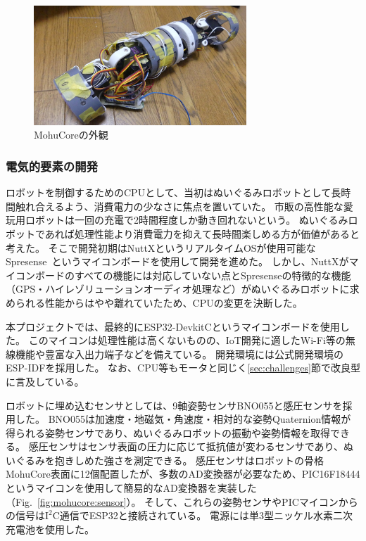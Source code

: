 \documentclass[uplatex,a4paper,12pt]{jsarticle}
\renewcommand{\figurename}{Fig.}
\newcommand{\figref}[1]{\figurename~\ref{#1}}
\begin{document}
\begin{figure}[htbp]
  \centering
  \includegraphics[width=8cm]{images/mohucore/skeleton.jpg}
  \caption{MohuCoreの外観}
  \label{fig:mohucore:skeleton}
\end{figure}

\subsubsection{電気的要素の開発}
ロボットを制御するためのCPUとして、当初はぬいぐるみロボットとして長時間触れ合えるよう、消費電力の少なさに焦点を置いていた。
市販の高性能な愛玩用ロボットは一回の充電で2時間程度しか動き回れないという。
ぬいぐるみロボットであれば処理性能より消費電力を抑えて長時間楽しめる方が価値があると考えた。
そこで開発初期はNuttXというリアルタイムOSが使用可能なSpresense~\cite{web_spresense}というマイコンボードを使用して開発を進めた。
しかし、NuttXがマイコンボードのすべての機能には対応していない点とSpresenseの特徴的な機能（GPS・ハイレゾリューションオーディオ処理など）がぬいぐるみロボットに求められる性能からはやや離れていたため、CPUの変更を決断した。

本プロジェクトでは、最終的にESP32-DevkitCというマイコンボードを使用した。
このマイコンは処理性能は高くないものの、IoT開発に適したWi-Fi等の無線機能や豊富な入出力端子などを備えている。
開発環境には公式開発環境のESP-IDFを採用した。
なお、CPU等もモータと同じく\ref{sec:challenges}節で改良型に言及している。

ロボットに埋め込むセンサとしては、9軸姿勢センサBNO055と感圧センサを採用した。
BNO055は加速度・地磁気・角速度・相対的な姿勢Quaternion情報が得られる姿勢センサであり、ぬいぐるみロボットの振動や姿勢情報を取得できる。
感圧センサはセンサ表面の圧力に応じて抵抗値が変わるセンサであり、ぬいぐるみを抱きしめた強さを測定できる。
感圧センサはロボットの骨格MohuCore表面に12個配置したが、多数のAD変換器が必要なため、PIC16F18444というマイコンを使用して簡易的なAD変換器を実装した（\figref{fig:mohucore:sensor}）。
そして、これらの姿勢センサやPICマイコンからの信号は\(\mathrm{I^2C}\)通信でESP32と接続されている。
電源には単3型ニッケル水素二次充電池を使用した。
\end{document}
